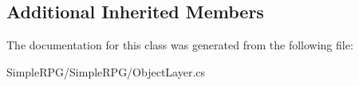 \subsection*{Additional Inherited Members}


The documentation for this class was generated from the following file\-:\begin{DoxyCompactItemize}
\item 
Simple\-R\-P\-G/\-Simple\-R\-P\-G/Object\-Layer.\-cs\end{DoxyCompactItemize}
